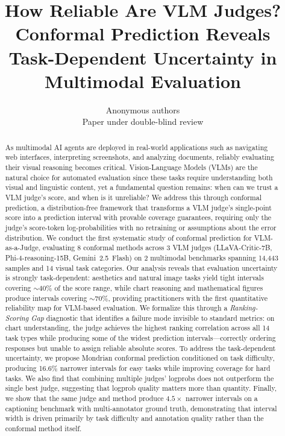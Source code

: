 \documentclass{article}
\title{How Reliable Are VLM Judges? Conformal Prediction Reveals \\ Task-Dependent Uncertainty in Multimodal Evaluation}
\author{Anonymous authors\\Paper under double-blind review}
\begin{document}
\ifcolmsubmission
\linenumbers
\fi

\maketitle

\begin{abstract}
As multimodal AI agents are deployed in real-world applications such as navigating web interfaces, interpreting screenshots, and analyzing documents, reliably evaluating their visual reasoning becomes critical. Vision-Language Models (VLMs) are the natural choice for automated evaluation since these tasks require understanding both visual and linguistic content, yet a fundamental question remains: when can we trust a VLM judge's score, and when is it unreliable? We address this through conformal prediction, a distribution-free framework that transforms a VLM judge's single-point score into a prediction interval with provable coverage guarantees, requiring only the judge's score-token log-probabilities with no retraining or assumptions about the error distribution. We conduct the first systematic study of conformal prediction for VLM-as-a-Judge, evaluating 8 conformal methods across 3 VLM judges (LLaVA-Critic-7B, Phi-4-reasoning-15B, Gemini~2.5~Flash) on 2 multimodal benchmarks spanning 14,443 samples and 14 visual task categories. Our analysis reveals that evaluation uncertainty is strongly task-dependent: aesthetics and natural image tasks yield tight intervals covering ${\sim}40\%$ of the score range, while chart reasoning and mathematical figures produce intervals covering ${\sim}70\%$, providing practitioners with the first quantitative reliability map for VLM-based evaluation. We formalize this through a \emph{Ranking-Scoring Gap} diagnostic that identifies a failure mode invisible to standard metrics: on chart understanding, the judge achieves the highest ranking correlation across all 14 task types while producing some of the widest prediction intervals---correctly ordering responses but unable to assign reliable absolute scores. To address the task-dependent uncertainty, we propose Mondrian conformal prediction conditioned on task difficulty, producing 16.6\% narrower intervals for easy tasks while improving coverage for hard tasks. We also find that combining multiple judges' logprobs does not outperform the single best judge, suggesting that logprob quality matters more than quantity. Finally, we show that the same judge and method produce $4.5\times$ narrower intervals on a captioning benchmark with multi-annotator ground truth, demonstrating that interval width is driven primarily by task difficulty and annotation quality rather than the conformal method itself.
\end{abstract}
\end{document}
